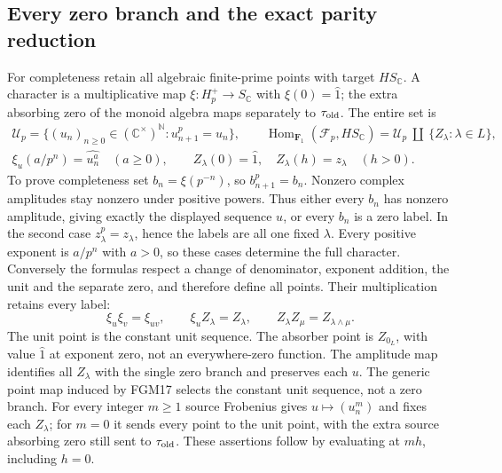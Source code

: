 \subsection{Every zero branch and the exact parity reduction}
For completeness retain all algebraic finite-prime points with
target $HS_{\mathbb C}$. A character is a multiplicative map
$\xi:H_p^+\to S_{\mathbb C}$ with $\xi(0)=\widehat1$;
the extra absorbing zero of the monoid algebra maps separately
to $\tau_{\rm old}$. The entire set is
\begin{equation}\tag{FGM21}
 \begin{gathered}
 \mathcal U_p=\{(u_n)_{n\ge0}\in(\mathbb C^\times)^{\mathbb N}:
                         u_{n+1}^{p}=u_n\},\qquad
 \operatorname{Hom}_{\mathbf F_1}(\mathcal F_p,HS_{\mathbb C})
       =\mathcal U_p\ \amalg\ \{Z_\lambda:\lambda\in L\},\\
 \xi_u(a/p^n)=\widehat{u_n^a}\quad(a\ge0),\qquad
 Z_\lambda(0)=\widehat1,\quad Z_\lambda(h)=z_\lambda\quad(h>0).
 \end{gathered}
\end{equation}
To prove completeness set $b_n=\xi(p^{-n})$, so $b_{n+1}^p=b_n$.
Nonzero complex amplitudes stay nonzero under positive powers.
Thus either every $b_n$ has nonzero amplitude, giving exactly the
displayed sequence $u$, or every $b_n$ is a zero label. In the
second case $z_\lambda^p=z_\lambda$, hence the labels are all one
fixed $\lambda$. Every positive exponent is $a/p^n$ with $a>0$,
so these cases determine the full character. Conversely the
formulas respect a change of denominator, exponent addition,
the unit and the separate zero, and therefore define all points.
Their multiplication retains every label:
\begin{equation}\tag{FGM22}
 \xi_u\xi_v=\xi_{uv},\qquad \xi_uZ_\lambda=Z_\lambda,
 \qquad Z_\lambda Z_\mu=Z_{\lambda\wedge\mu}.
\end{equation}
The unit point is the constant unit sequence. The absorber point
is $Z_{0_L}$, with value $\widehat1$ at exponent zero, not an
everywhere-zero function. The amplitude map identifies all
$Z_\lambda$ with the single zero branch and preserves each $u$.
The generic point map induced by FGM17 selects the constant unit
sequence, not a zero branch. For every integer $m\ge1$ source
Frobenius gives $u\mapsto(u_n^m)$ and fixes each $Z_\lambda$;
for $m=0$ it sends every point to the unit point, with the extra
source absorbing zero still sent to $\tau_{\rm old}$.
These assertions follow by evaluating at $mh$, including $h=0$.

